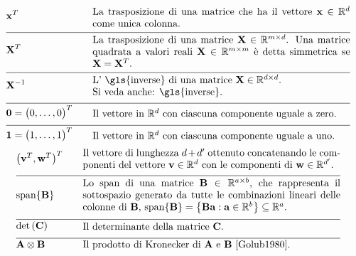 \begin{align}
	&\featurevec^{T} &\quad & \parbox{.75\textwidth}{La trasposizione di una matrice che ha il vettore
		$\featurevec \in \mathbb{R}^{\dimlocalmodel}$ come unica colonna.} \nonumber \\[2mm] \hline \nonumber\\[-5mm]
	&\mathbf{X}^{T} &\quad & \parbox{.75\textwidth}{La trasposizione di una matrice $\mathbf{X} \in \mathbb{R}^{\samplesize \times \featurelen}$. 
		Una matrice quadrata a valori reali $\mathbf{X} \in \mathbb{R}^{\samplesize \times \samplesize}$ 
		è detta simmetrica se $\mathbf{X} = \mathbf{X}^{T}$. }  \nonumber \\[2mm] \hline \nonumber\\[-5mm]
		&\mathbf{X}^{-1} &\quad & \parbox{.75\textwidth}{L' \gls{inverse} di una matrice $\mathbf{X} \in \mathbb{R}^{\featurelen \times \featurelen}$.
		\\ Si veda anche: \gls{inverse}. }  \nonumber \\[2mm] \hline \nonumber\\[-5mm]
	&\mathbf{0}= \big(0,\ldots,0\big)^{T}  & \quad &  \parbox{.75\textwidth}{Il vettore in $\mathbb{R}^{\dimlocalmodel}$ con ciascuna componente uguale a zero.} \nonumber \\[2mm] \hline \nonumber\\[-5mm]
	&\mathbf{1}= \big(1,\ldots,1\big)^{T}  & \quad &  \parbox{.75\textwidth}{Il vettore in $\mathbb{R}^{\dimlocalmodel}$ con ciascuna componente uguale a uno.} \nonumber
\end{align} 
\newpage
\begin{align} 
	&\big(\vv^{T},\vw^{T} \big)^{T}  & \quad &  \parbox{.75\textwidth}{Il vettore di lunghezza $\featurelen+\featurelen'$ 
		ottenuto concatenando le componenti del vettore $\vv \in \mathbb{R}^{\featurelen}$ con le componenti di $\vw \in \mathbb{R}^{\featurelen'}$.} \nonumber \nonumber \\[2mm] \hline \nonumber\\[-5mm]
	&	{\rm span}\{ \mathbf{B} \}  & \quad &  \parbox{.75\textwidth}{Lo span di una matrice $\mathbf{B} \in \mathbb{R}^{a \times b}$, 
		che rappresenta il sottospazio generato da tutte le combinazioni lineari delle colonne di $\mathbf{B}$, 
		${\rm span}\{ \mathbf{B} \} = \big\{  \mathbf{B} \va : \va \in \mathbb{R}^{b} \big\} \subseteq \mathbb{R}^{a}$.}\nonumber \\[2mm] \hline \nonumber\\[-5mm]
	&\determinant{\mC} &\quad & \parbox{.75\textwidth}{Il determinante della matrice $\mC$. } \nonumber \\[2mm] \hline \nonumber\\[-5mm]
	&\mathbf{A} \otimes \mathbf{B} &\quad & \parbox{.75\textwidth}{Il prodotto di Kronecker di $\mathbf{A}$ e $\mathbf{B}$ \cite{Golub1980}. }  \nonumber
\end{align} 

